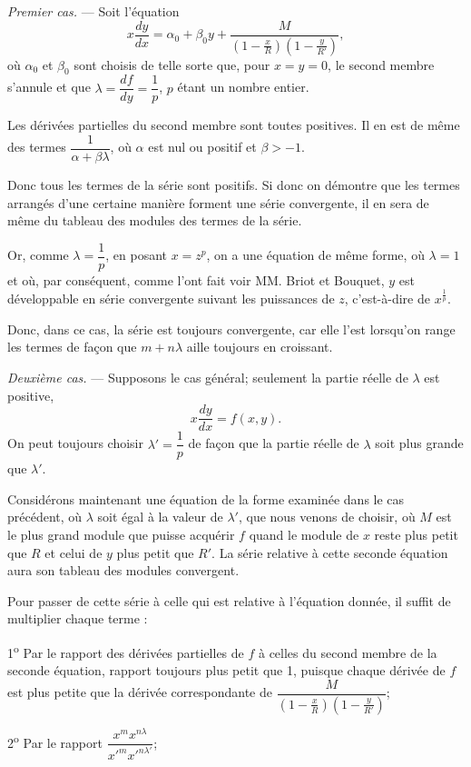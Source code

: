 \documentclass[11pt]{article}
\begin{document}
\emph{Premier cas.} — Soit l’équation
\[
x\frac{dy}{dx}=\alpha_0+\beta_0y+\frac{M}{\left(1-\frac{x}{R}\right)\left(1-\frac{y}{R'}\right)},
\]
où $\alpha_0$ et $\beta_0$ sont choisis de telle sorte que, pour $x=y=0$, le second membre s’annule et que $\lambda=\dfrac{df}{dy}=\dfrac1p$, $p$ étant un nombre entier.

Les dérivées partielles du second membre sont toutes positives. Il en est de même des termes $\dfrac{1}{\alpha+\beta\lambda}$, où $\alpha$ est nul ou positif et $\beta>-1$.

Donc tous les termes de la série sont positifs. Si donc on démontre que les termes arrangés d’une certaine manière forment une série convergente, il en sera de même du tableau des modules des termes de la série.

Or, comme $\lambda=\dfrac1p$, en posant $x=z^p$, on a une équation de même forme, où $\lambda=1$ et où, par conséquent, comme l’ont fait voir MM. Briot et Bouquet, $y$ est développable en série convergente suivant les puissances de $z$, c’est-à-dire de $x^{\frac1p}$.

Donc, dans ce cas, la série est toujours convergente, car elle l’est lorsqu’on range les termes de façon que $m+n\lambda$ aille toujours en croissant.

\emph{Deuxième cas.} — Supposons le cas général; seulement la partie réelle de $\lambda$ est positive,
\[
x\frac{dy}{dx}=f(x,y).
\]
On peut toujours choisir $\lambda'=\dfrac1p$ de façon que la partie réelle de $\lambda$ soit plus grande que $\lambda'$.

Considérons maintenant une équation de la forme examinée dans le cas précédent, où $\lambda$ soit égal à la valeur de $\lambda'$, que nous venons de choisir, où $M$ est le plus grand module que puisse acquérir $f$ quand le module de $x$ reste plus petit que $R$ et celui de $y$ plus petit que $R'$. La série relative à cette seconde équation aura son tableau des modules convergent.

Pour passer de cette série à celle qui est relative à l’équation donnée, il suffit de multiplier chaque terme :

1\textsuperscript{o} Par le rapport des dérivées partielles de $f$ à celles du second membre de la seconde équation, rapport toujours plus petit que 1, puisque chaque dérivée de $f$ est plus petite que la dérivée correspondante de $\dfrac{M}{\left(1-\frac{x}{R}\right)\left(1-\frac{y}{R'}\right)}$;

2\textsuperscript{o} Par le rapport $\dfrac{x^m x^{n\lambda}}{x'^m x'^{n\lambda'}}$;
\end{document}
